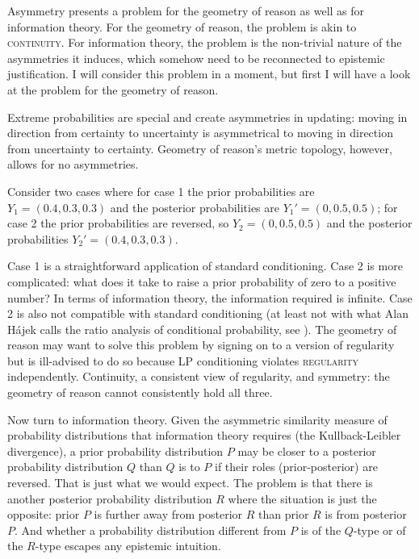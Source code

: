 \documentclass[12pt]{article}
\begin{document}
Asymmetry presents a problem for the geometry of reason as well as for
information theory. For the geometry of reason, the problem is akin to
\textsc{continuity}. For information theory, the problem is the
non-trivial nature of the asymmetries it induces, which somehow need
to be reconnected to epistemic justification. I will consider this
problem in a moment, but first I will have a look at the problem for
the geometry of reason.

Extreme probabilities are special and create asymmetries in updating:
moving in direction from certainty to uncertainty is asymmetrical to
moving in direction from uncertainty to certainty. Geometry of
reason's metric topology, however, allows for no asymmetries.

\begin{example}
  \label{ex:extreme}
  Consider two cases where for case 1 the prior probabilities are
  $Y_{1}=(0.4,0.3,0.3)$ and the posterior probabilities are
  $Y_{1}'=(0,0.5,0.5)$; for case 2 the prior probabilities are
  reversed, so $Y_{2}=(0,0.5,0.5)$ and the posterior probabilities
  $Y_{2}'=(0.4,0.3,0.3)$.
\end{example}

Case 1 is a straightforward application of standard conditioning. Case
2 is more complicated: what does it take to raise a prior probability
of zero to a positive number? In terms of information theory, the
information required is infinite. Case 2 is also not compatible with
standard conditioning (at least not with what Alan H{\'a}jek calls the
ratio analysis of conditional probability, see ).
The geometry of reason may want to solve this problem by signing on to
a version of regularity but is ill-advised to do so because LP
conditioning violates \textsc{regularity} independently.
Continuity, a consistent view of regularity, and symmetry: the 
geometry of reason cannot consistently hold all three.

Now turn to information theory. Given the asymmetric similarity
measure of probability distributions that information theory requires
(the Kullback-Leibler divergence), a prior probability distribution
$P$ may be closer to a posterior probability distribution $Q$ than $Q$
is to $P$ if their roles (prior-posterior) are reversed. That is just
what we would expect. The problem is that there is another posterior
probability distribution $R$ where the situation is just the opposite:
prior $P$ is further away from posterior $R$ than prior $R$ is from
posterior $P$. And whether a probability distribution different from
$P$ is of the $Q$-type or of the $R$-type escapes any epistemic
intuition.
\end{document}
